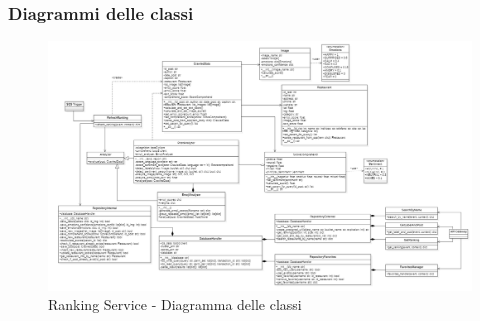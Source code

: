 \subsubsection{Diagrammi delle classi}
\begin{figure}[H]
    \centerfloat
    \includegraphics[scale=0.35]{Contenuto/Immagini/classi-RS.png}
    \caption{Ranking Service - Diagramma delle classi}
\end{figure}

